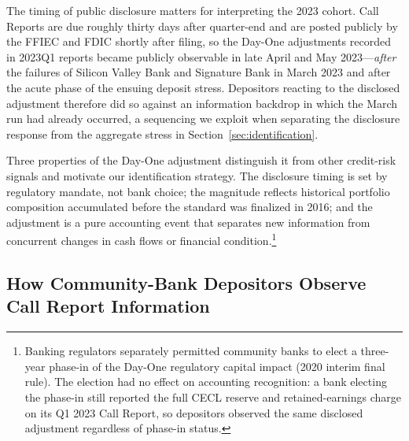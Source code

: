 The timing of public disclosure matters for interpreting the 2023 cohort.
Call Reports are due roughly thirty days after quarter-end and are posted
publicly by the FFIEC and FDIC shortly after filing, so the Day-One adjustments
recorded in 2023Q1 reports became publicly observable in late April and May
2023---\emph{after} the failures of Silicon Valley Bank and Signature Bank in
March 2023 and after the acute phase of the ensuing deposit stress.  Depositors
reacting to the disclosed adjustment therefore did so against an information
backdrop in which the March run had already occurred, a sequencing we exploit
when separating the disclosure response from the aggregate stress in
Section~\ref{sec:identification}.

\medskip\noindent
Three properties of the Day-One adjustment distinguish it from other credit-risk
signals and motivate our identification strategy.  The disclosure timing is set
by regulatory mandate, not bank choice; the magnitude reflects historical
portfolio composition accumulated before the standard was finalized in 2016; and
the adjustment is a pure accounting event that separates new information from
concurrent changes in cash flows or financial condition.\footnote{Banking
regulators separately permitted community banks to elect a three-year phase-in
of the Day-One regulatory capital impact (2020 interim final rule).  The
election had no effect on accounting recognition: a bank electing the phase-in
still reported the full CECL reserve and retained-earnings charge on its Q1 2023
Call Report, so depositors observed the same disclosed adjustment regardless of
phase-in status.}

\subsection{How Community-Bank Depositors Observe Call Report Information}
\label{sec:background:observation}

